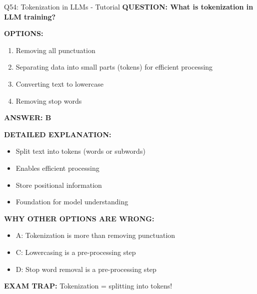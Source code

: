 \documentclass[8pt]{beamer}
\begin{document}
	\begin{frame}{Q54: Tokenization in LLMs - Tutorial}
		\fontsize{6.5}{7.5}\selectfont
		\textbf{QUESTION: What is tokenization in LLM training?}
		
		\vspace{0.1cm}
		\textbf{OPTIONS:}
		\begin{enumerate}
			\item Removing all punctuation
			\item Separating data into small parts (tokens) for efficient processing
			\item Converting text to lowercase
			\item Removing stop words
		\end{enumerate}
		
		\vspace{0.1cm}
		\textcolor{myblue}{\textbf{ANSWER: B}}
		
		\vspace{0.1cm}
		\textbf{DETAILED EXPLANATION:}
		\begin{itemize}
			\item Split text into tokens (words or subwords)
			\item Enables efficient processing
			\item Store positional information
			\item Foundation for model understanding
		\end{itemize}
		
		\vspace{0.1cm}
		\textcolor{myred}{\textbf{WHY OTHER OPTIONS ARE WRONG:}}
		\begin{itemize}
			\item \textcolor{myred}{A:} Tokenization is more than removing punctuation
			\item \textcolor{myred}{C:} Lowercasing is a pre-processing step
			\item \textcolor{myred}{D:} Stop word removal is a pre-processing step
		\end{itemize}
		
		\textcolor{myred}{\textbf{EXAM TRAP:}} Tokenization = \textcolor{myblue}{splitting into tokens}!
	\end{frame}
	
\end{document}
